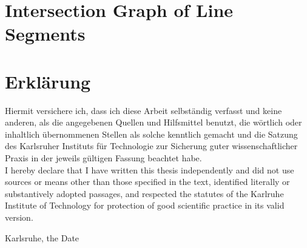 \documentclass[12pt,a4paper]{scrartcl}
\theoremstyle{plain}
\theoremstyle{definition}
\numberwithin{equation}{section}
\begin{document}
\section{Intersection Graph of Line Segments}

\newpage

 
 
 



      

\newpage
  
 \thispagestyle{empty}


\vspace*{8cm}


\section*{Erklärung}

Hiermit versichere ich, dass ich diese Arbeit selbständig verfasst und keine anderen, als die angegebenen Quellen und Hilfsmittel benutzt, die wörtlich oder inhaltlich übernommenen Stellen als solche kenntlich gemacht und die Satzung des Karlsruher Instituts für Technologie zur Sicherung guter wissenschaftlicher Praxis in der jeweils gültigen Fassung beachtet habe. \\[2ex] 

I hereby declare that I have written this thesis independently and did not use sources or means other than those specified in the text, identified literally or substantively adopted passages, and respected the statutes of the Karlruhe Institute of Technology for protection of good scientific practice in its valid version.



\noindent
Karlsruhe, the Date \\[5ex]

\end{document}
